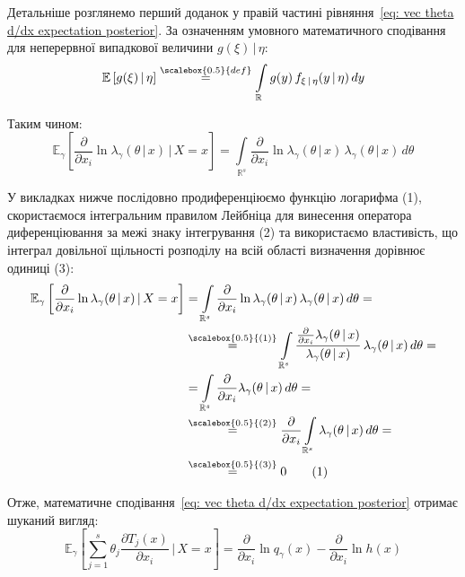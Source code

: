 \documentclass{mathreport}
\begin{document}
Детальніше розглянемо перший доданок у правій частині рівняння~\eqref{eq: vec theta d/dx expectation posterior}. За означенням умовного математичного сподівання для неперервної випадкової величини $g(\xi) \,|\, \eta:$
\begin{equation}\label{eq: def conditional expectation}
    \mathbb{E}\left[ g(\xi) \,|\, \eta \right] \overset{\scalebox{0.5}{def}}{=} \int\limits_{\mathbb{R}} g(y) \, f_{\xi \,|\, \eta}(y \,|\, \eta) \, dy
\end{equation}

Таким чином:
\begin{equation}\label{eq: vec theta d/dx ln expectation posterior}
    \mathbb{E}_{\gamma}\left[ \frac{\partial}{\partial x_i}\ln{\lambda_{\gamma}(\theta \,|\, x)} \,|\, X=x \right] = \int\limits_{\mathbb{R}^s} \frac{\partial}{\partial x_i}\ln{\lambda_{\gamma}(\theta \,|\, x)} \, \lambda_{\gamma}(\theta \,|\, x) \, d\theta
\end{equation}

У викладках нижче послідовно продиференціюємо функцію логарифма (1), скористаємося інтегральним правилом Лейбніца для винесення оператора диференціювання за межі знаку інтегрування (2) та використаємо властивість, що інтеграл довільної щільності розподілу на всій області визначення дорівнює одиниці (3): 
\begin{align*}\label{eq: Leibniz rule}
    \mathbb{E}_{\gamma}\left[ \frac{\partial}{\partial x_i}\ln{\lambda_{\gamma}(\theta \,|\, x)} \,|\, X=x \right] & = \int\limits_{\mathbb{R}^s} \frac{\partial}{\partial x_i}\ln{\lambda_{\gamma}(\theta \,|\, x)} \, \lambda_{\gamma}(\theta \,|\, x) \, d\theta = \\
    & \overset{\scalebox{0.5}{(1)}}{=} \int\limits_{\mathbb{R}^s} \frac{\frac{\partial}{\partial x_i}\lambda_{\gamma}(\theta \,|\, x)}{\lambda_{\gamma}(\theta \,|\, x)} \, \lambda_{\gamma}(\theta \,|\, x) \, d\theta = \\
    & = \int\limits_{\mathbb{R}^s} \frac{\partial}{\partial x_i}\lambda_{\gamma}(\theta \,|\, x) \, d\theta = \\
    & \overset{\scalebox{0.5}{(2)}}{=} \frac{\partial}{\partial x_i} \int\limits_{\mathbb{R}^s} \lambda_{\gamma}(\theta \,|\, x) \, d\theta = \\
    & \overset{\scalebox{0.5}{(3)}}{=} 0 \stepcounter{equation}\tag{\theequation}
\end{align*}

Отже, математичне сподівання~\eqref{eq: vec theta d/dx expectation posterior} отримає шуканий вигляд:
\begin{equation}\label{eq: vec theta d/dx final expectation posterior}
    \mathbb{E}_{\gamma}\left[ \sum\limits_{j=1}^{s}\theta_j \frac{\partial T_j(x)}{\partial x_i} \,|\, X=x \right] = \frac{\partial}{\partial x_i}\ln{q_{\gamma}(x)} - \frac{\partial}{\partial x_i}\ln{h(x)}
\end{equation}
\end{document}
